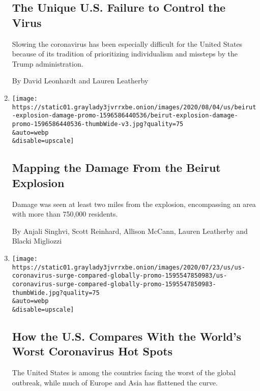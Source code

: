 \begin{enumerate}
  \hypertarget{the-unique-us-failure-to-control-the-virus}{%
  \subsection{The Unique U.S. Failure to Control the
  Virus}\label{the-unique-us-failure-to-control-the-virus}}

  Slowing the coronavirus has been especially difficult for the United
  States because of its tradition of prioritizing individualism and
  missteps by the Trump administration.

  By David Leonhardt and Lauren Leatherby
\item
  \href{/interactive/2020/08/04/world/middleeast/beirut-explosion-damage.html}{}

  \texttt{[image: https://static01.graylady3jvrrxbe.onion/images/2020/08/04/us/beirut-explosion-damage-promo-1596586440536/beirut-explosion-damage-promo-1596586440536-thumbWide-v3.jpg?quality=75\\\&auto=webp\\\&disable=upscale]}

  \hypertarget{mapping-the-damage-from-the-beirut-explosion}{%
  \subsection{Mapping the Damage From the Beirut
  Explosion}\label{mapping-the-damage-from-the-beirut-explosion}}

  Damage was seen at least two miles from the explosion, encompassing an
  area with more than 750,000 residents.

  By Anjali Singhvi, Scott Reinhard, Allison McCann, Lauren Leatherby
  and Blacki Migliozzi
\item
  \href{/interactive/2020/07/23/us/coronavirus-hotspots-countries.html}{}

  \texttt{[image: https://static01.graylady3jvrrxbe.onion/images/2020/07/23/us/us-coronavirus-surge-compared-globally-promo-1595547850983/us-coronavirus-surge-compared-globally-promo-1595547850983-thumbWide.jpg?quality=75\\\&auto=webp\\\&disable=upscale]}

  \hypertarget{how-the-us-compares-with-the-worlds-worst-coronavirus-hot-spots}{%
  \subsection{How the U.S. Compares With the World's Worst Coronavirus
  Hot
  Spots}\label{how-the-us-compares-with-the-worlds-worst-coronavirus-hot-spots}}

  The United States is among the countries facing the worst of the
  global outbreak, while much of Europe and Asia has flattened the
  curve.


\end{enumerate}
